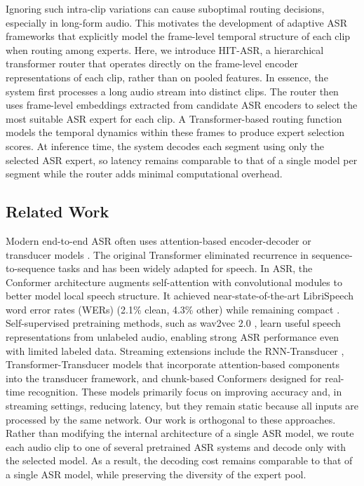 \documentclass[journal]{IEEEtran}
\begin{document}
Ignoring such intra-clip variations can  cause suboptimal routing decisions, especially in long-form audio. This motivates the development of adaptive ASR frameworks that explicitly model the frame-level temporal structure of each clip when routing among experts. Here, we introduce HIT-ASR, a hierarchical transformer router that operates directly on the frame-level encoder representations of each clip, rather than on pooled features. In essence, the system first processes a long audio stream into distinct clips. The router then uses frame-level embeddings extracted from candidate ASR encoders to select the most suitable ASR expert for each clip. A Transformer-based routing function models the temporal dynamics within these frames to produce expert selection scores. At inference time, the system decodes each segment using only the selected ASR expert, so latency remains comparable to that of a single model per segment while the router adds minimal computational overhead.

 
\subsection{Related Work}
\label{sec:related_work}

Modern end-to-end ASR often uses attention-based encoder-decoder or transducer models \cite{deng_conf}. The original Transformer \cite{vaswani2017attention} eliminated recurrence in sequence-to-sequence tasks and has been widely adapted for speech. In ASR, the Conformer architecture \cite{gulati2020conformer} augments self-attention with convolutional modules to better model local speech structure. It achieved near-state-of-the-art LibriSpeech word error rates (WERs) (2.1\% clean, 4.3\% other) while remaining compact \cite{gulati2020conformer}. Self-supervised pretraining methods, such as wav2vec 2.0 \cite{baevski2020wav2vec}, learn useful speech representations from unlabeled audio, enabling strong ASR performance even with limited labeled data. Streaming extensions include the RNN-Transducer \cite{Graves2012SequenceTW}, Transformer-Transducer models that incorporate attention-based components into the transducer framework, and chunk-based Conformers designed for real-time recognition. These models primarily focus on improving accuracy and, in streaming settings, reducing latency, but they remain static because all inputs are processed by the same network. Our work is orthogonal to these approaches. Rather than modifying the internal architecture of a single ASR model, we route each audio clip to one of several pretrained ASR systems and decode only with the selected model. As a result, the decoding cost remains comparable to that of a single ASR model, while preserving the diversity of the expert pool.
\end{document}
